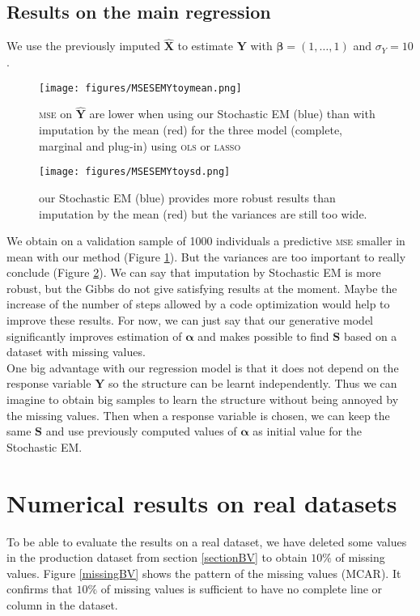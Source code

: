 \documentclass[12pt,a4paper]{report}
\begin{document}
		\subsection{Results on the main regression}
		We use the previously imputed $\hat{\boldsymbol{X}}$ to estimate $\boldsymbol{Y}$ with $\boldsymbol{\beta}=(1,\dots,1)$ and $\sigma_Y=10$.
			\begin{figure}[h!]
	\centering
	\texttt{[image: figures/MSESEMYtoymean.png]} 
	\caption{\textsc{mse} on $\hat{\boldsymbol{Y}}$ are lower when using our Stochastic EM (blue) than with imputation by the mean (red) for the three model (complete, marginal and plug-in) using \textsc{ols} or \textsc{lasso}}\label{MSESEMYtoymean}
\end{figure}	

			\begin{figure}[h!]
	\centering
	\texttt{[image: figures/MSESEMYtoysd.png]} 
	\caption{our Stochastic EM (blue) provides more robust results than imputation by the mean (red) but the variances are still too wide.}\label{MSESEMYtoysd}
\end{figure}		
We obtain on a validation sample of 1000 individuals a predictive \textsc{mse} smaller in mean with our method (Figure \ref{MSESEMYtoymean}). But the variances are too important to really conclude (Figure \ref{MSESEMYtoysd}). We can say that imputation by Stochastic EM is more robust, but the Gibbs do not give satisfying results at the moment. Maybe the increase of the number of steps allowed by a code optimization would help to improve these results. For now, we can just say that our generative model significantly improves estimation of $\boldsymbol{\alpha}$ and makes possible to find $\boldsymbol{S}$ based on a dataset with missing values.\\

		One big advantage with our regression model is that it does not depend on the response variable $\boldsymbol{Y}$ so the structure can be learnt independently. Thus we can imagine to obtain big samples to learn the structure without being annoyed by the missing values. Then when a response variable is chosen, we can keep the same $\boldsymbol{S}$ and use previously computed values of $\boldsymbol{\alpha}$ as initial value for the Stochastic EM. 

	\section{Numerical results on real datasets}	
		To be able to evaluate the results on a real dataset, we have deleted some values in the production dataset from section \ref{sectionBV} to obtain $10\%$ of missing values. Figure \ref{missingBV} shows the pattern of the missing values (MCAR). It confirms that $10\%$ of missing values is sufficient to have no complete line or column in the dataset. 
	
\end{document}
